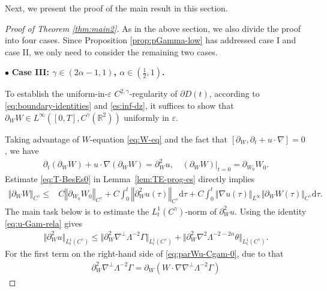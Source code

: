 \documentclass[reqno,11pt,a4paper]{amsart}
\newcommand{\R}{\ensuremath{\mathbb{R}}}
\def \p {\partial}
\begin{document}
Next, we present the proof of the main result in this section.
\begin{proof}[Proof of Theorem \ref{thm:main2}]
As in the above section, we also divide the proof into four cases.
Since Proposition \ref{prop:pGamma-low} has addressed case I and case II, 
we only need to consider the remaining two cases.
\vskip1mm

$\bullet$ \textbf{Case III: $\gamma\in (2\alpha-1,1)$, $\alpha\in(\frac{1}{2},1)$.} 
\vskip1mm

To establish the uniform-in-$\varepsilon$ $C^{2,\gamma}$-regularity of $\p D(t)$, according to \eqref{eq:boundary-identities} and \eqref{es:inf-dz}, 
it suffices to show that $\partial_W W \in L^\infty([0,T], C^\gamma(\R^2))$ uniformly in $\varepsilon$. 

Taking advantage of $W$-equation \eqref{eq:W-eq} and the fact that $[\p _W, \p _t+u\cdot\nabla]=0$, we have 
\begin{equation}\label{pWW}
\begin{split}
  \partial_t (\p_W W) + u\cdot\nabla (\p_W W) =  \partial_W^2 u , \quad  (\p_W W)|_{t=0}  = \p_{W_0} W_0.
\end{split}
\end{equation}
Estimate \eqref{eq:T-BesEs0} in Lemma~\ref{lem:TE-prog-es} directly implies
\begin{equation}
\begin{aligned}
  \Vert \p_W  W\Vert _{C^\gamma} \leq & C \left\Vert \p_{W_0}  W_0\right\Vert _{C^\gamma}
  + C \int_0^t\left\Vert \partial_W^2 u(\tau) \right\Vert _{C^\gamma} \mathrm{d} \tau
  + C \int_0^t \Vert \nabla u(\tau)\Vert _{L^\infty} \Vert \p_W  W(\tau)\Vert _{C^\gamma}  \mathrm{d} \tau .
\end{aligned}
\end{equation}
The main task below is to estimate the $L^1_t(C^\gamma)$-norm of $\partial_W^2 u$. Using the identity 
\eqref{eq:u-Gam-rela} gives
\begin{align}\label{eq:parWu-Cgam-0}
  \Vert \partial_W^2 u\Vert _{L^1_t(C^\gamma)} 
  \leq \big\Vert \partial_W^2  \nabla^{\perp} \Lambda^{-2} \Gamma\big\Vert _{L^1_t(C^\gamma)}
  + \big\Vert \partial_W^2 \nabla^2 \Lambda^{-2-2\alpha} \theta \big\Vert _{L^1_t(C^\gamma)}.
\end{align}
For the first term on the right-hand side of \eqref{eq:parWu-Cgam-0}, due to that 
\begin{align*}
  \partial_W^2  \nabla^{\perp} \Lambda^{-2} \Gamma
  = \partial_W(W\cdot\nabla  \nabla^{\perp} \Lambda^{-2} \Gamma)

\end{align*}
\end{proof}
\end{document}
